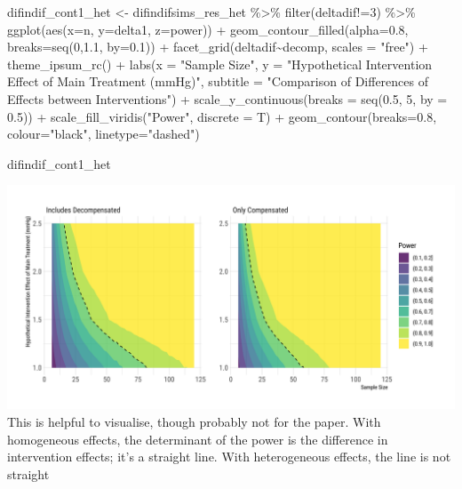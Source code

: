 \documentclass[
]{article}
\newenvironment{Shaded}{\begin{snugshade}}{\end{snugshade}}
\newcommand{\AttributeTok}[1]{\textcolor[rgb]{0.77,0.63,0.00}{#1}}
\newcommand{\DecValTok}[1]{\textcolor[rgb]{0.00,0.00,0.81}{#1}}
\newcommand{\FloatTok}[1]{\textcolor[rgb]{0.00,0.00,0.81}{#1}}
\newcommand{\FunctionTok}[1]{\textcolor[rgb]{0.00,0.00,0.00}{#1}}
\newcommand{\NormalTok}[1]{#1}
\newcommand{\OtherTok}[1]{\textcolor[rgb]{0.56,0.35,0.01}{#1}}
\newcommand{\SpecialCharTok}[1]{\textcolor[rgb]{0.00,0.00,0.00}{#1}}
\newcommand{\StringTok}[1]{\textcolor[rgb]{0.31,0.60,0.02}{#1}}
\begin{document}
\begin{Shaded}
\begin{Highlighting}[]
\NormalTok{difindif\_cont1\_het }\OtherTok{\textless{}{-}}\NormalTok{ difindifsims\_res\_het }\SpecialCharTok{\%\textgreater{}\%} 
  \FunctionTok{filter}\NormalTok{(deltadif}\SpecialCharTok{!=}\DecValTok{3}\NormalTok{) }\SpecialCharTok{\%\textgreater{}\%} 
  \FunctionTok{ggplot}\NormalTok{(}\FunctionTok{aes}\NormalTok{(}\AttributeTok{x=}\NormalTok{n, }\AttributeTok{y=}\NormalTok{delta1, }\AttributeTok{z=}\NormalTok{power)) }\SpecialCharTok{+}
  \FunctionTok{geom\_contour\_filled}\NormalTok{(}\AttributeTok{alpha=}\FloatTok{0.8}\NormalTok{, }\AttributeTok{breaks=}\FunctionTok{seq}\NormalTok{(}\DecValTok{0}\NormalTok{,}\FloatTok{1.1}\NormalTok{, }\AttributeTok{by=}\FloatTok{0.1}\NormalTok{)) }\SpecialCharTok{+}
  \FunctionTok{facet\_grid}\NormalTok{(deltadif}\SpecialCharTok{\textasciitilde{}}\NormalTok{decomp, }\AttributeTok{scales =} \StringTok{"free"}\NormalTok{) }\SpecialCharTok{+}
  \FunctionTok{theme\_ipsum\_rc}\NormalTok{() }\SpecialCharTok{+}
  \FunctionTok{labs}\NormalTok{(}\AttributeTok{x =} \StringTok{"Sample Size"}\NormalTok{,}
       \AttributeTok{y =} \StringTok{"Hypothetical Intervention Effect of Main Treatment (mmHg)"}\NormalTok{,}
       \AttributeTok{subtitle =} \StringTok{"Comparison of Differences of Effects between Interventions"}\NormalTok{) }\SpecialCharTok{+}
  \FunctionTok{scale\_y\_continuous}\NormalTok{(}\AttributeTok{breaks =} \FunctionTok{seq}\NormalTok{(}\FloatTok{0.5}\NormalTok{, }\DecValTok{5}\NormalTok{, }\AttributeTok{by =} \FloatTok{0.5}\NormalTok{)) }\SpecialCharTok{+}
  \FunctionTok{scale\_fill\_viridis}\NormalTok{(}\StringTok{"Power"}\NormalTok{, }\AttributeTok{discrete =}\NormalTok{ T) }\SpecialCharTok{+}
  \FunctionTok{geom\_contour}\NormalTok{(}\AttributeTok{breaks=}\FloatTok{0.8}\NormalTok{, }\AttributeTok{colour=}\StringTok{"black"}\NormalTok{, }\AttributeTok{linetype=}\StringTok{"dashed"}\NormalTok{)    }

\NormalTok{difindif\_cont1\_het}
\end{Highlighting}
\end{Shaded}

\includegraphics{figures/unnamed-chunk-76-2.png} This is helpful to
visualise, though probably not for the paper. With homogeneous effects,
the determinant of the power is the difference in intervention effects;
it's a straight line. With heterogeneous effects, the line is not
straight
\end{document}
